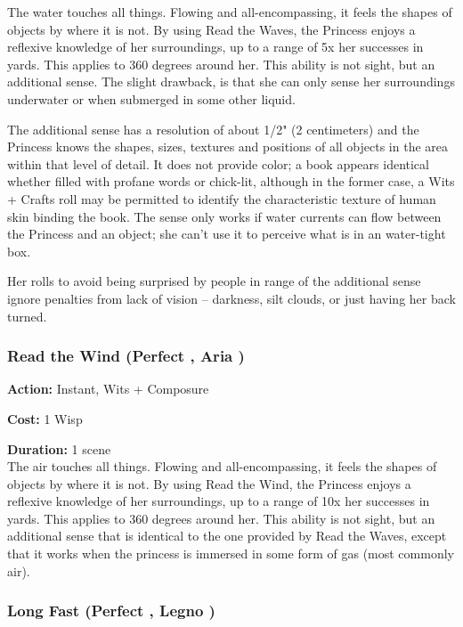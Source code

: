 \noindent The water touches all things. Flowing and all-encompassing, it feels the shapes of objects by where it is not. By using Read the Waves, the Princess enjoys a reflexive knowledge of her surroundings, up to a range of 5x her successes in yards. This applies to 360 degrees around her. This ability is not sight, but an additional sense. The slight drawback, is that she can only sense her surroundings underwater or when submerged in some other liquid. 

The additional sense has a resolution of about 1/2" (2 centimeters) and the Princess knows the shapes, sizes, textures and positions of all objects in the area within that level of detail. It does not provide color; a book appears identical whether filled with profane words or chick-lit, although in the former case, a Wits + Crafts roll may be permitted to identify the characteristic texture of human skin binding the book. The sense only works if water currents can flow between the Princess and an object; she can't use it to perceive what is in an water-tight box. 

Her rolls to avoid being surprised by people in range of the additional sense ignore penalties from lack of vision -- darkness, silt clouds, or just having her back turned.

\subsubsection*{Read the Wind (Perfect \textbullet, Aria \textbullet)}

\noindent \textbf{Action:} Instant, Wits + Composure

\noindent \textbf{Cost:} 1 Wisp

\noindent \textbf{Duration:} 1 scene \\

\noindent The air touches all things. Flowing and all-encompassing, it feels the shapes of objects by where it is not. By using Read the Wind, the Princess enjoys a reflexive knowledge of her surroundings, up to a range of 10x her successes in yards. This applies to 360 degrees around her. This ability is not sight, but an additional sense that is identical to the one provided by Read the Waves, except that it works when the princess is immersed in some form of gas (most commonly air). 

\subsubsection*{Long Fast (Perfect \textbullet, Legno \textbullet)}

